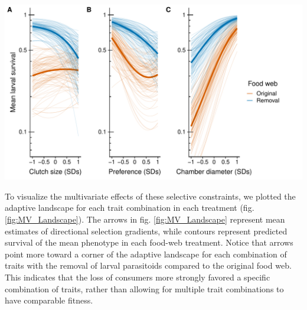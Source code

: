 \documentclass[11pt,]{article}
\let\origfigure\figure
\let\endorigfigure\endfigure
\renewenvironment{figure}[1][2] {
    \expandafter\origfigure\expandafter[H]
} {
    \endorigfigure
}
\begin{document}
\begin{figure}
\centering
\includegraphics{../analyses/UV_landscapes.pdf}
\caption{\label{fig:UV_Landscape}Adaptive landscape of gall midge
phenotypes in the original food web and with the removal of larval
parasitoids. Each panel corresponds to a different phenotypic trait:
chamber diameter (A); oviposition preference (B); and clutch size (C).
Bold lines represent selection experienced in the original (orange) and
removal (blue) food webs (orange). Thin lines represent bootstrapped
replicates to show the uncertainty in selection. For clarity, we only
display 100 bootstraps even though inferences are based on 1,000
replicates. Note that mean larval survival is plotted on a natural log
scale to reflect the mathematical definition of the adaptive landscape.}
\end{figure}

To visualize the multivariate effects of these selective constraints, we
plotted the adaptive landscape for each trait combination in each
treatment (fig. \ref{fig:MV_Landscape}). The arrows in fig.
\ref{fig:MV_Landscape} represent mean estimates of directional selection
gradients, while contours represent predicted survival of the mean
phenotype in each food-web treatment. Notice that arrows point more
toward a corner of the adaptive landscape for each combination of traits
with the removal of larval parasitoids compared to the original food
web. This indicates that the loss of consumers more strongly favored a
specific combination of traits, rather than allowing for multiple trait
combinations to have comparable fitness.
\end{document}
